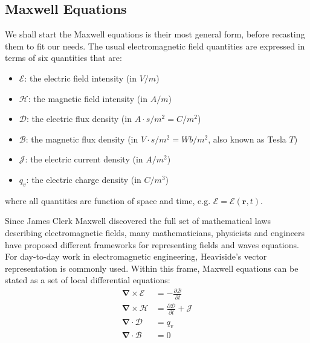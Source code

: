 \subsection{Maxwell Equations}
We shall start the Maxwell equations is their most general form, before recasting them to fit our needs. The usual electromagnetic field quantities are expressed in terms of six quantities that are:
\begin{itemize}
 \item $\boldsymbol{\mathcal{E}}$: the electric field intensity (in $V/m$)
 \item $\boldsymbol{\mathcal{H}}$: the magnetic field intensity (in $A/m$)
 \item $\boldsymbol{\mathcal{D}}$: the electric flux density (in $A\cdot s/m^2=C/m^2$)
 \item $\boldsymbol{\mathcal{B}}$: the magnetic flux density (in $V\cdot s/m^2=Wb/m^2$, also known as Tesla $T$)
 \item $\boldsymbol{\mathcal{J}}$: the electric current density (in $A/m^2$)
 \item $q_v$: the electric charge density (in $C/m^3$)
\end{itemize}
where all quantities are function of space and time, e.g. $\boldsymbol{\mathcal{E}}=\boldsymbol{\mathcal{E}}(\mathbf{r},t)$.

Since James Clerk Maxwell discovered the full set of mathematical laws describing electromagnetic fields, many mathematicians, physicists and engineers have proposed different frameworks for representing fields and waves equations\parencite{Lindell2004, Warnick2014}. For day-to-day work in electromagnetic engineering, Heaviside's vector representation is commonly used. Within this frame,  Maxwell equations can be stated as a set of local differential equations:
\begin{subequations}
 \begin{align}
  \boldsymbol{\nabla} \times \boldsymbol{\mathcal{E}} &= -\frac{\partial \boldsymbol{\mathcal{B}}}{\partial t} \label{eq:Maxwell-Faraday}\\
  \boldsymbol{\nabla} \times \boldsymbol{\mathcal{H}} &= \frac{\partial \boldsymbol{\mathcal{D}}}{\partial t} + \boldsymbol{\mathcal{J}} \label{eq:Maxwell-Ampere} \\
  \boldsymbol{\nabla} \cdot \boldsymbol{\mathcal{D}} &= q_v \label{eq:Maxwell-Gauss} \\
  \boldsymbol{\nabla} \cdot \boldsymbol{\mathcal{B}} &= 0 \label{eq:Maxwell-Gauss-Magnetism}
 \end{align}
 \label{eq:MaxwellEquations}
\end{subequations} 

